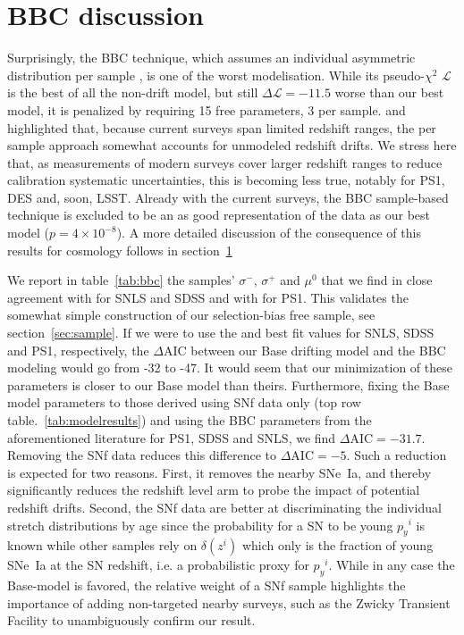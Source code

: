 \documentclass[]{aa} %
\newcommand{\mr}[1]{{\textcolor[rgb]{0.60,0.10,0.6}{#1}}}
\newcommand{\nn}[1]{{\textcolor[rgb]{1, 0.27, 0}{#1}}}
\begin{document}
\section{\nn{BBC discussion}}
\label{sec:bbc}
\mr{Surprisingly, the BBC technique, which assumes an individual asymmetric
    distribution per sample \citep{scolnic2016,kessler2017}, is one of the worst
    modelisation. While its pseudo-$\chi^{2}$ $\mathcal{L}$ is the best of all
    the non-drift model, but still $\Delta \mathcal{L}=-11.5$ worse than our
    best model, it is penalized by requiring 15 free parameters, 3 per sample.
    \citet[][section~2]{scolnic2016} and \citet[][section~5.4]{scolnic2018a}
    highlighted that, because current surveys span limited redshift ranges, the
    per sample approach somewhat accounts for unmodeled redshift drifts. We
    stress here that, as measurements of modern surveys cover larger redshift
    ranges to reduce calibration systematic  uncertainties, this is becoming
    less true, notably for PS1, DES and, soon, LSST. Already with the current
    surveys, the BBC sample-based technique is excluded to be an as good
    representation of the data as our best model ($p=4\times 10^{-8}$). A more
    detailed discussion of the consequence of this results for cosmology follows
in section~\ref{sec:bbc}}

\mr{We report in table~\ref{tab:bbc} the samples' $\sigma^-$, $\sigma^+$ and
    $\mu^0$ that we find in close agreement with \cite{scolnic2016} for SNLS and
    SDSS and with \cite{scolnic2018a} for PS1. This validates \nn{the} somewhat
    simple construction of our selection-bias free sample, see
    section~\ref{sec:sample}. If we were to use the \cite{scolnic2016} and
    \cite{scolnic2018a} best fit values for SNLS, SDSS and PS1, respectively,
    the $\Delta\mathrm{AIC}$ between our Base drifting model and the BBC
    modeling would go from -32 to -47. \nn{It would seem that our minimization
    of these parameters is closer to our Base model than theirs}. Furthermore,
    fixing the Base model parameters to those derived using SNf data only (top
    row table.~\ref{tab:modelresults}) and using the BBC parameters from the
    aforementioned literature for PS1, SDSS and SNLS, we find
    $\Delta\mathrm{AIC}=-31.7$. Removing the SNf data reduces this difference to
    $\Delta\mathrm{AIC}=-5$. Such a reduction is expected for two reasons.
    First, it removes the nearby SNe~Ia, and thereby significantly reduces the
    redshift level arm to probe the impact of potential redshift drifts.
    Second, the SNf data are better at discriminating the individual stretch
    distributions by age since the probability for a SN to be young $p_y{}^i$ is
    known while other samples rely on $\delta(z^i)$ which only is the fraction
    of young SNe~Ia at the SN redshift, i.e. a probabilistic proxy for
    $p_y{}^i$. While in any case the Base-model is favored, the relative weight
    of a SNf sample highlights the importance of adding non-targeted nearby
surveys, such as the Zwicky Transient Facility \cite[ZTF,][]{bellm2019,
graham2019} to unambiguously confirm our result.}
\end{document}
